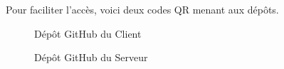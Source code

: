 \documentclass[12pt]{report}
\begin{document}
	Pour faciliter l’accès, voici deux codes QR menant aux dépôts.
	
	\begin{figure}[H]
		\centering
		\begin{minipage}[t]{0.32\textwidth}
			\centering
			\caption*{Dépôt GitHub du Client}
		\end{minipage}
		\hfill
		\begin{minipage}[t]{0.32\textwidth}
			\centering
			\caption*{Dépôt GitHub du Serveur}
		\end{minipage}
		
	\end{figure}
	
\end{document}
